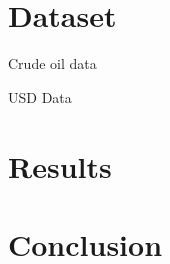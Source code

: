 \section{Dataset} \label{sec:data}
Crude oil data \cite{crude-oil-data}

USD Data \cite{usd-data}
\section{Results} \label{sec:results}
\section{Conclusion} \label{sec:conclusion}

